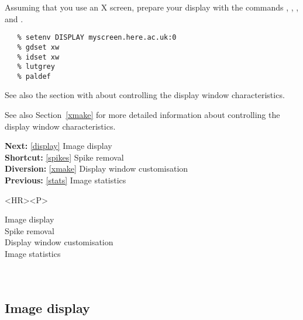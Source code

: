    Assuming that you use an X screen, prepare your display with the commands
{\tt {}},
{\tt {}},
{\tt {}},
   and
{\tt {}}.

\begin{verbatim}
   % setenv DISPLAY myscreen.here.ac.uk:0
   % gdset xw
   % idset xw
   % lutgrey
   % paldef
\end{verbatim}

\begin{htmlonly}
   See also the section with
   about controlling the display window characteristics.
\end{htmlonly}
\begin{latexonly}
   See also
Section~\ref{xmake}
   for more detailed information
   about controlling the display window characteristics.
\end{latexonly}

\begin{latexonly}
{\bf Next:} \ref{display} Image display\\
{\bf Shortcut:} \ref{spikes} Spike removal\\
{\bf Diversion:} \ref{xmake} Display window customisation\\
{\bf Previous:} \ref{stats} Image statistics\\
\end{latexonly}

\begin{htmlonly}
\begin{rawhtml} <HR><P> \end{rawhtml}
{\bf {}} Image display\\
{\bf {}} Spike removal\\
{\bf {}} Display window customisation\\
{\bf {}} Image statistics\\
{\bf {}}\\
{\bf {}}\\
\end{htmlonly}


\subsection{\label{display}Image display}

